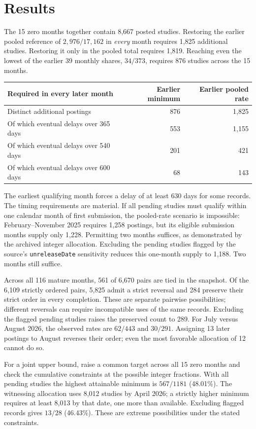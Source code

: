 \documentclass[11pt]{article}
\begin{document}
\section{Results}
The 15 zero months together contain 8,667 posted studies. Restoring the earlier pooled reference of $2,976/17,162$ in \emph{every} month requires 1,825 additional studies. Restoring it only in the pooled total requires 1,819. Reaching even the lowest of the earlier 39 monthly shares, $34/373$, requires 876 studies across the 15 months.
\begin{center}\begin{tabular}{lrr}\toprule
Required in every later month & Earlier minimum & Earlier pooled rate\\\midrule
Distinct additional postings & 876 & 1,825\\
Of which eventual delays over 365 days & 553 & 1,155\\
Of which eventual delays over 540 days & 201 & 421\\
Of which eventual delays over 600 days & 68 & 143\\\bottomrule
\end{tabular}\end{center}
The earliest qualifying month forces a delay of at least 630 days for some records. The timing requirements are material. If all pending studies must qualify within one calendar month of first submission, the pooled-rate scenario is impossible: February--November 2025 requires 1,258 postings, but its eligible submission months supply only 1,228. Permitting two months suffices, as demonstrated by the archived integer allocation. Excluding the pending studies flagged by the source's \texttt{unreleaseDate} sensitivity reduces this one-month supply to 1,188. Two months still suffice.

Across all 116 mature months, 561 of 6,670 pairs are tied in the snapshot. Of the 6,109 strictly ordered pairs, 5,825 admit a strict reversal and 284 preserve their strict order in every completion. These are separate pairwise possibilities; different reversals can require incompatible uses of the same records. Excluding the flagged pending studies raises the preserved count to 289. For July versus August 2026, the observed rates are $62/443$ and $30/291$. Assigning 13 later postings to August reverses their order; even the most favorable allocation of 12 cannot do so.

For a joint upper bound, raise a common target across all 15 zero months and check the cumulative constraints at the possible integer fractions. With all pending studies the highest attainable minimum is $567/1181$ (48.01\%). The witnessing allocation uses 8,012 studies by April 2026; a strictly higher minimum requires at least 8,013 by that date, one more than available. Excluding flagged records gives $13/28$ (46.43\%). These are extreme possibilities under the stated constraints.
\end{document}

